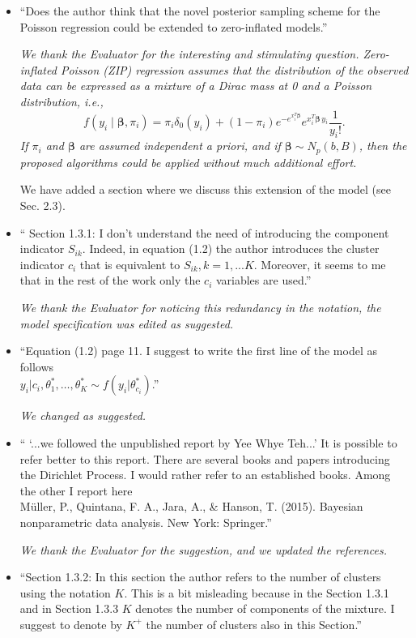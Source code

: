 \documentclass[11pt]{letter}
\begin{document}
\begin{itemize}
%
\item ``Does the author think that the novel posterior sampling scheme for the Poisson regression could be extended to zero-inflated models.''\vskip1mm

{\em
	We thank the Evaluator for the interesting and stimulating question.
	Zero-inflated Poisson (ZIP) regression assumes that the distribution of the observed data can be expressed as a mixture of a Dirac mass at 0 and a Poisson distribution, i.e.,
	$$ f(y_i \mid \bm{\beta}, \pi_i) = \pi_i \delta_0(y_i) + (1-\pi_i) e^{-e^{x_i^T\bm{\beta}}} e^{x_i^T\bm{\beta}\, y_i} \frac{1}{y_i!}.$$
	If $\pi_i$ and $\bm{\beta}$ are assumed independent a priori, and if $\bm{\beta} \sim N_p(b,B)$, then the proposed algorithms could be applied without much additional effort.
	
	We have added a section where we discuss this extension of the model (see Sec. 2.3).
}
\vskip3mm

%
\item `` Section 1.3.1: 
I don't understand the need of introducing the component indicator $S_{ik}$. Indeed, in equation (1.2) the author introduces the cluster indicator $c_i$ that is equivalent to ${S_{ik},k=1,...K}$. Moreover, it seems to me that in the rest of the work only the $c_i$ variables are used.''
\vskip1mm

{\em 
	We thank the Evaluator for noticing this redundancy in the notation, the model specification was edited as suggested.
}
\vskip3mm

%
\item ``Equation (1.2) page 11.
I suggest to write the first line of the model as follows\\
$y_i|c_i,\theta^*_1,\dots,\theta^*_K \sim f(y_i|\theta^*_{c_i})$.''
\vskip1mm

{\em 
	We changed as suggested.
}
\vskip3mm

%
\item `` `...we followed the unpublished report by Yee Whye Teh...'
It is possible to refer better to this report. There are several books and papers introducing the Dirichlet Process. I would rather refer to an established books. Among the other I report here\\
M\"uller, P., Quintana, F. A., Jara, A., \& Hanson, T. (2015). Bayesian nonparametric data analysis. New York: Springer.''\vskip1mm

{\em 
	We thank the Evaluator for the suggestion, and we updated the references.
}
\vskip3mm

%
\item ``Section 1.3.2:
In this section the author refers to the number of clusters using the notation $K$. This is a bit misleading because in the Section 1.3.1 and in Section 1.3.3 $K$ denotes the number of components of the mixture. I suggest to denote by $K^+$ the number of clusters also in this Section.''\vskip1mm


\end{itemize}
\end{document}

